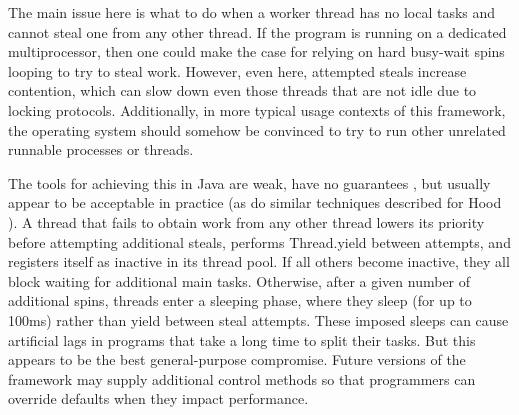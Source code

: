 The main issue here is what to do when a worker thread has no local
tasks and cannot steal one from any other thread. If the program is
running on a dedicated multiprocessor, then one could make the case
for relying on hard busy-wait spins looping to try to steal
work. However, even here, attempted steals increase contention, which
can slow down even those threads that are not idle due to locking
protocols.  Additionally, in more typical usage contexts of this
framework, the operating system should somehow be convinced to try to
run other unrelated runnable processes or threads.

The tools for achieving this in Java are weak, have no guarantees
\cite{Goetz2006}, but usually appear to be acceptable in practice (as
do similar techniques described for Hood \cite{Blumofe1998}). A thread
that fails to obtain work from any other thread lowers its priority
before attempting additional steals, performs Thread.yield between
attempts, and registers itself as inactive in its thread pool. If all
others become inactive, they all block waiting for additional main
tasks. Otherwise, after a given number of additional spins, threads
enter a sleeping phase, where they sleep (for up to 100ms) rather than
yield between steal attempts. These imposed sleeps can cause
artificial lags in programs that take a long time to split their
tasks. But this appears to be the best general-purpose
compromise. Future versions of the framework may supply additional
control methods so that programmers can override defaults when they
impact performance.

